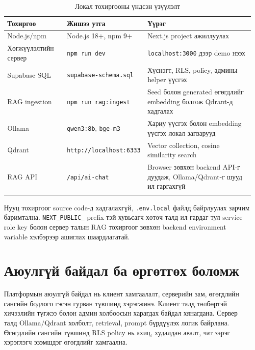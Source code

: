 \begin{longtable}{|p{}|p{}|p{}|}
  \hline
  \textbf{Тохиргоо} & \textbf{Жишээ утга} & \textbf{Үүрэг} \\ \hline
  Node.js/npm & Node.js 18+, npm 9+ & Next.js project ажиллуулах \\ \hline
  Хөгжүүлэлтийн сервер & \texttt{npm run dev} & \texttt{localhost:3000} дээр demo нээх \\ \hline
  Supabase SQL & \texttt{supabase-schema.sql} & Хүснэгт, RLS, policy, админы helper үүсгэх \\ \hline
  RAG ingestion & \texttt{npm run rag:ingest} & Seed болон generated өгөгдлийг embedding болгож Qdrant-д хадгалах \\ \hline
  Ollama & \texttt{qwen3:8b}, \texttt{bge-m3} & Хариу үүсгэх болон embedding үүсгэх локал загварууд \\ \hline
  Qdrant & \texttt{http://localhost:6333} & Vector collection, cosine similarity search \\ \hline
  RAG API & \texttt{/api/ai-chat} & Browser зөвхөн backend API-г дуудаж, Ollama/Qdrant-г шууд ил гаргахгүй \\ \hline
  \caption{Локал тохиргооны үндсэн үзүүлэлт}
  \label{tab:ch3-local-setup}
\end{longtable}

Нууц тохиргоог source code-д хадгалахгүй, \texttt{.env.local} файлд байрлуулах зарчим баримтална. \texttt{NEXT\_PUBLIC\_} prefix-тэй хувьсагч хөтөч талд ил гардаг тул service role key болон сервер талын RAG тохиргоог зөвхөн backend environment variable хэлбэрээр ашиглах шаардлагатай.

\section{Аюулгүй байдал ба өргөтгөх боломж}
Платформын аюулгүй байдал нь клиент хамгаалалт, серверийн зам, өгөгдлийн сангийн бодлого гэсэн гурван түвшинд хэрэгжинэ. Клиент талд төлбөртэй хичээлийн түгжээ болон админ холбоосын харагдах байдал хянагдана. Сервер талд Ollama/Qdrant холболт, retrieval, prompt бүрдүүлэх логик байрлана. Өгөгдлийн сангийн түвшинд RLS policy нь ахиц, худалдан авалт, чат зэрэг хэрэглэгч эзэмшдэг өгөгдлийг хамгаална.


